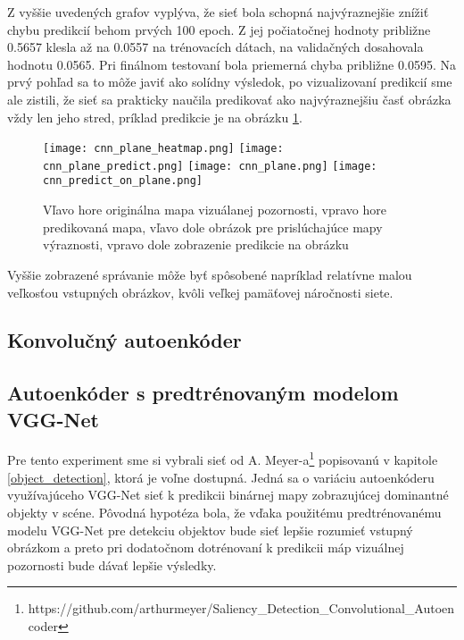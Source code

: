 Z vyššie uvedených grafov vyplýva, že sieť bola schopná najvýraznejšie znížiť chybu predikcií behom prvých 100 epoch. Z jej počiatočnej hodnoty približne 0.5657 klesla až na 0.0557 na trénovacích dátach, na validačných dosahovala hodnotu 0.0565. Pri finálnom testovaní bola priemerná chyba približne 0.0595. Na prvý pohľad sa to môže javiť ako solídny výsledok, po vizualizovaní predikcií sme ale zistili, že sieť sa prakticky naučila predikovať ako najvýraznejšiu časť obrázka vždy len jeho stred, príklad predikcie je na obrázku \ref{cnn_results}.

\begin{figure}[H]
	\begin{center}
		
		\texttt{[image: cnn\_plane\_heatmap.png]}
		\texttt{[image: cnn\_plane\_predict.png]}
		\texttt{[image: cnn\_plane.png]}
		\texttt{[image: cnn\_predict\_on\_plane.png]}
		\caption[Vzorka predikcie konvolučnej neurónovej siete]{
			Vľavo hore originálna mapa vizuálanej pozornosti, vpravo hore predikovaná mapa, vľavo dole obrázok pre prislúchajúce mapy výraznosti, vpravo dole zobrazenie predikcie na obrázku
		}\label{cnn_results}
	\end{center}
\end{figure}

Vyššie zobrazené správanie môže byť spôsobené napríklad relatívne malou veľkosťou vstupných obrázkov, kvôli veľkej pamäťovej náročnosti siete. 

\subsection{Konvolučný autoenkóder}
\label{experiments_autoencoder}


\subsection{Autoenkóder s predtrénovaným modelom VGG-Net}
\label{experiments_vgg_net}

Pre tento experiment sme si vybrali sieť od A. Meyer-a\footnote{https://github.com/arthurmeyer/Saliency\_Detection\_Convolutional\_Autoencoder} popisovanú v kapitole \ref{object_detection}, ktorá je voľne dostupná. Jedná sa o variáciu autoenkóderu využívajúceho VGG-Net sieť k predikcii binárnej mapy zobrazujúcej dominantné objekty v scéne. Pôvodná hypotéza bola, že vďaka použitému predtrénovanému modelu VGG-Net pre detekciu objektov bude sieť lepšie rozumieť vstupný obrázkom a preto pri dodatočnom dotrénovaní k predikcii máp vizuálnej pozornosti bude dávať lepšie výsledky. 

